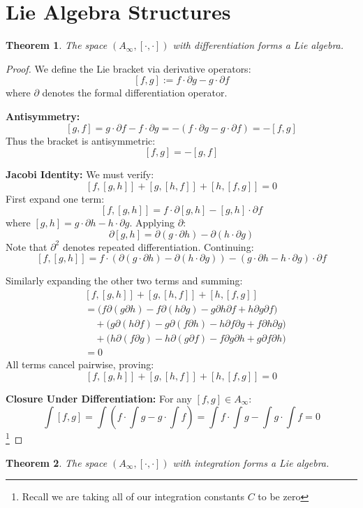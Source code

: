 \documentclass[10pt, oneside]{article}
\newtheorem{thm}{Theorem}
\begin{document}
\section{Lie Algebra Structures}
   \begin{thm}
The space $(A_\infty, [\cdot,\cdot])$ with differentiation forms a Lie algebra.
\end{thm}
\begin{proof}
We define the Lie bracket via derivative operators:
\[
[f,g] := f \cdot \partial g - g \cdot \partial f 
\]
where $\partial$ denotes the formal differentiation operator.

\noindent\textbf{Antisymmetry:}
\[
[g,f] = g \cdot \partial f - f \cdot \partial g = - (f \cdot \partial g - g \cdot \partial f) = -[f,g]
\]
Thus the bracket is antisymmetric:
\[
\boxed{[f,g] = -[g,f]}
\]

\noindent\textbf{Jacobi Identity:}
We must verify:
\[
[f,[g,h]] + [g,[h,f]] + [h,[f,g]] = 0
\]
First expand one term:
\[
[f,[g,h]] = f \cdot \partial[g,h] - [g,h] \cdot \partial f
\]
where $[g,h] = g \cdot \partial h - h \cdot \partial g$. Applying $\partial$:
\[
\partial[g,h] = \partial(g \cdot \partial h) - \partial(h \cdot \partial g)
\]
Note that $\partial^2$ denotes repeated differentiation. Continuing:
\[
[f,[g,h]] = f \cdot (\partial(g \cdot \partial h) - \partial(h \cdot \partial g)) - (g \cdot \partial h - h \cdot \partial g) \cdot \partial f
\]

Similarly expanding the other two terms and summing:
\[
\begin{aligned}
&[f,[g,h]] + [g,[h,f]] + [h,[f,g]] \\
&= \big(f \partial(g \partial h) - f \partial(h \partial g) - g \partial h \partial f + h \partial g \partial f\big) \\
&\quad + \big(g \partial(h \partial f) - g \partial(f \partial h) - h \partial f \partial g + f \partial h \partial g\big) \\
&\quad + \big(h \partial(f \partial g) - h \partial(g \partial f) - f \partial g \partial h + g \partial f \partial h\big) \\
&= 0
\end{aligned}
\]
All terms cancel pairwise, proving:
\[
\boxed{[f,[g,h]] + [g,[h,f]] + [h,[f,g]] = 0}
\]

\noindent\textbf{Closure Under Differentiation:}
For any $[f,g] \in A_\infty$:
\[
\int [f,g] = \int (f \cdot \int g - g \cdot \int f) = \int f \cdot \int g - \int g \cdot \int f = 0
\]
\footnote{Recall we are taking all of our integration constants $C$ to be zero}
\end{proof}
\begin{thm}
The space $(A_\infty, [\cdot,\cdot])$ with integration forms a Lie algebra.
\end{thm}
\end{document}
